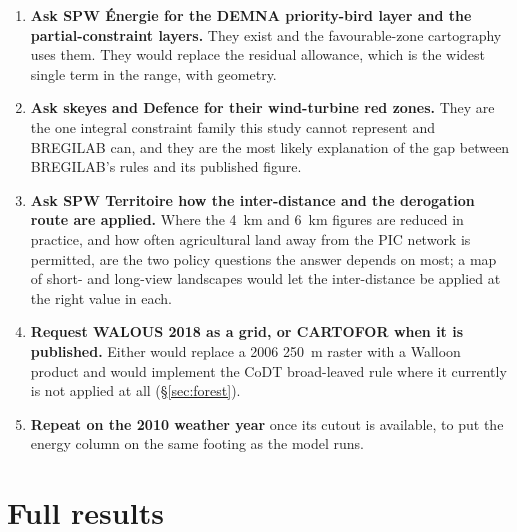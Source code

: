 \documentclass[11pt,a4paper]{article}
\begin{document}
\begin{enumerate}
  \item \textbf{Ask SPW Énergie for the DEMNA priority-bird layer and the
    partial-constraint layers.} They exist and the favourable-zone cartography
    uses them. They would replace the residual allowance, which is the widest
    single term in the range, with geometry.
  \item \textbf{Ask skeyes and Defence for their wind-turbine red zones.} They
    are the one integral constraint family this study cannot represent and
    BREGILAB can, and they are the most likely explanation of the gap between
    BREGILAB's rules and its published figure.
  \item \textbf{Ask SPW Territoire how the inter-distance and the derogation
    route are applied.} Where the 4~km and 6~km figures are reduced in
    practice, and how often agricultural land away from the PIC network is
    permitted, are the two policy questions the answer depends on most; a map
    of short- and long-view landscapes would let the inter-distance be applied
    at the right value in each.
  \item \textbf{Request WALOUS 2018 as a grid, or CARTOFOR when it is
    published.} Either would replace a 2006 \SI{250}{\metre} raster with a
    Walloon product and would implement the CoDT broad-leaved rule where it
    currently is not applied at all (§\ref{sec:forest}).
  \item \textbf{Repeat on the 2010 weather year} once its cutout is available,
    to put the energy column on the same footing as the model runs.
\end{enumerate}

\appendix
\section{Full results}\label{sec:full}

\begin{table}[htbp]\centering\small
\caption{All scenarios and turbine classes at the reference capacity density,
administrative Walloon Region.}

\end{table}

\begin{table}[htbp]\centering\footnotesize
\caption{Allocation results for every turbine class and spacing. \emph{free} is
the minimum-distance allocation alone, in row-major and pseudo-random order;
\emph{parks} adds the park rule, smaller groups included on the land a park of
four cannot use; \emph{horizon} the open-horizon rule; the \emph{km} rows add
the inter-distance between parks; one row keeps only parks of four or more.}
\label{tab:placement}
\resizebox{\linewidth}{!}{}
\end{table}
\end{document}
